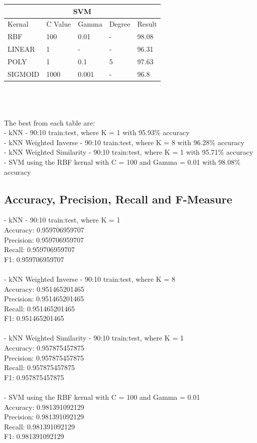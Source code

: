 \documentclass[paper=a4, fontsize=11pt]{scrartcl}
\numberwithin{equation}{section}		%
\numberwithin{figure}{section}			%
\numberwithin{table}{section}				%
\begin{document}
\begin{tabular}{ |p{2cm}|p{2cm}|p{2cm}|p{2cm}||p{4cm}| }
 \hline
 \multicolumn{5}{|c|}{SVM} \\
 \hline
Kernal & C Value & Gamma & Degree & Result\\
 \hline
RBF & 100 & 0.01 & - & 98.08 \\
LINEAR & 1 & - & - & 96.31 \\
POLY & 1 & 0.1 & 5 & 97.63 \\
SIGMOID & 1000 & 0.001 & - & 96.8 \\
 \hline
\end{tabular}
\\
\\
\\
The best from each table are:\\
- kNN - 90:10 train:test, where K = 1 with 95.93\% accuracy \\
- kNN Weighted Inverse - 90:10 train:test, where K = 8 with 96.28\% accuracy \\
- kNN Weighted Similarity - 90:10 train:test, where K = 1 with 95.71\% accuracy \\
- SVM using the RBF kernal with C = 100 and Gamma = 0.01 with 98.08\% accuracy

\subsection{Accuracy, Precision, Recall and F-Measure}

- kNN - 90:10 train:test, where K = 1\\
Accuracy: 0.959706959707\\
Precision: 0.959706959707\\
Recall: 0.959706959707\\
F1: 0.959706959707\\
\\
- kNN Weighted Inverse - 90:10 train:test, where K = 8\\
Accuracy: 0.951465201465\\
Precision: 0.951465201465\\
Recall: 0.951465201465\\
F1: 0.951465201465\\
\\
- kNN Weighted Similarity - 90:10 train:test, where K = 1\\
Accuracy: 0.957875457875\\
Precision: 0.957875457875\\
Recall: 0.957875457875\\
F1: 0.957875457875\\
\\
- SVM using the RBF kernal with C = 100 and Gamma = 0.01\\
Accuracy: 0.981391092129\\
Precision: 0.981391092129\\
Recall: 0.981391092129\\
F1: 0.981391092129
\end{document}
